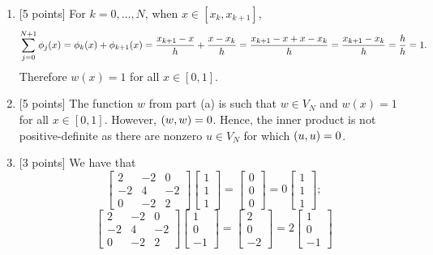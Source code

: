 \begin{solution}
\begin{enumerate}
\item  {[5 points]} For $k=0,\ldots,N$, when $x\in[x_k,x_{k+1}]$,
\[
\sum_{j=0}^{N+1}\phi_j(x)=\phi_k(x)+\phi_{k+1}(x)={x_{k+1}-x \over h}+{x-x_k \over h}={x_{k+1}-x+x-x_k \over h}={x_{k+1}-x_k \over h}={h \over h}=1.
\]
Therefore $w(x)=1$ for all $x\in[0,1]$.



\item {[5 points]} The function $w$ from part (a) is such that $w\in V_N$ and $w(x)=1$ for all $x\in[0,1]$. However, $(w,w)=0$. Hence, the inner product is not positive-definite as there are nonzero $u\in V_N$ for which $(u,u)=0$.

\item {[3 points]} We have that
\[
\left[\begin{array}{ccc}2 & -2 & 0 \\ -2 & 4 & -2 \\ 0 & -2 & 2\end{array}\right]\left[\begin{array}{c}1 \\ 1 \\ 1\end{array}\right]=\left[\begin{array}{c}0 \\ 0 \\ 0\end{array}\right]=0\left[\begin{array}{c}1 \\ 1 \\ 1\end{array}\right];
\]
\[
\left[\begin{array}{ccc}2 & -2 & 0 \\ -2 & 4 & -2 \\ 0 & -2 & 2\end{array}\right]\left[\begin{array}{c}1 \\ 0 \\ -1\end{array}\right]=\left[\begin{array}{c}2 \\ 0 \\ -2\end{array}\right]=2\left[\begin{array}{c}1 \\ 0 \\ -1\end{array}\right]
\]
\end{enumerate}
\end{solution}
